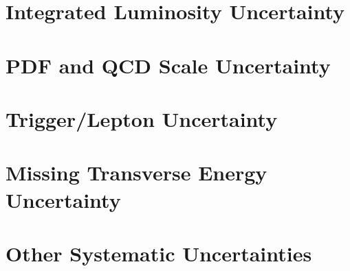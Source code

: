 \section{Integrated Luminosity Uncertainty}
\section{PDF and QCD Scale Uncertainty}
\section{Trigger/Lepton Uncertainty}
\section{Missing Transverse Energy Uncertainty}
\section{Other Systematic Uncertainties}

